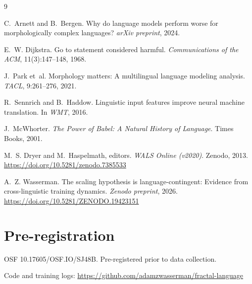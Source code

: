 \documentclass[11pt,a4paper]{article}
\begin{document}

\begin{thebibliography}{9}

C.~Arnett and B.~Bergen.
\newblock Why do language models perform worse for morphologically complex languages?
\newblock \emph{arXiv preprint}, 2024.

E.~W. Dijkstra.
\newblock Go to statement considered harmful.
\newblock \emph{Communications of the ACM}, 11(3):147--148, 1968.

J.~Park et~al.
\newblock Morphology matters: A multilingual language modeling analysis.
\newblock \emph{TACL}, 9:261--276, 2021.

R.~Sennrich and B.~Haddow.
\newblock Linguistic input features improve neural machine translation.
\newblock In \emph{WMT}, 2016.

J.~McWhorter.
\newblock \emph{The Power of Babel: A Natural History of Language}.
\newblock Times Books, 2001.

M.~S. Dryer and M.~Haspelmath, editors.
\newblock \emph{WALS Online (v2020)}.
\newblock Zenodo, 2013.
\newblock \url{https://doi.org/10.5281/zenodo.7385533}

A.~Z. Wasserman.
\newblock The scaling hypothesis is language-contingent: Evidence from cross-linguistic training dynamics.
\newblock \emph{Zenodo preprint}, 2026.
\newblock \url{https://doi.org/10.5281/ZENODO.19423151}

\end{thebibliography}

\appendix
\section{Pre-registration}

OSF 10.17605/OSF.IO/SJ48B. Pre-registered prior to data collection.

Code and training logs: \url{https://github.com/adamzwasserman/fractal-language}
\end{document}
